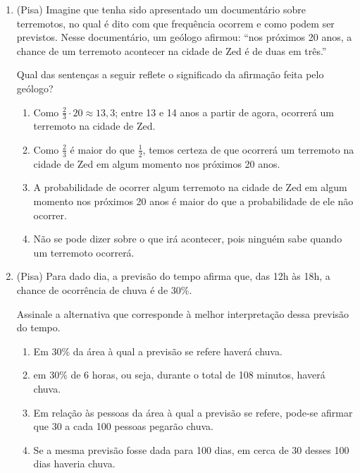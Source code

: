 \begin{enumerate}

\item (Pisa) Imagine que tenha sido apresentado um documentário sobre terremotos, no qual é dito com que frequência ocorrem  e como podem ser previstos. Nesse documentário, um geólogo afirmou: “nos próximos  20 anos, a chance de um terremoto acontecer na cidade de Zed é de duas em três.”

Qual das sentenças a seguir reflete o significado da afirmação feita pelo geólogo?
\begin{enumerate}
\item {} 
Como \(\frac{2}{3}\cdot 20\approx 13,3\); entre 13 e 14 anos a partir de agora, ocorrerá um terremoto na cidade de Zed.

\item {} 
Como \(\frac{2}{3}\) é maior do que \(\frac{1}{2}\), temos certeza de que ocorrerá um terremoto na cidade de Zed em algum momento nos próximos 20 anos.

\item {} 
A probabilidade de ocorrer algum terremoto na cidade de Zed em algum momento nos próximos 20 anos é maior do que a probabilidade de ele não ocorrer.

\item {} 
Não se pode dizer sobre o que irá acontecer, pois ninguém sabe quando um terremoto ocorrerá.

\end{enumerate}

\item (Pisa) Para dado dia, a previsão do tempo afirma que, das 12h às 18h, a chance de ocorrência de chuva é de 30\%.

Assinale a alternativa que corresponde à melhor interpretação dessa previsão do tempo.
\begin{enumerate}
\item {} 
Em 30\% da área à qual a previsão se refere haverá chuva.

\item {} 
em 30\% de 6 horas, ou seja, durante o total de 108 minutos, haverá chuva.

\item {} 
Em relação às pessoas da área à qual a previsão se refere, pode-se afirmar que 30 a cada 100 pessoas pegarão chuva.

\item {} 
Se a mesma previsão fosse dada para 100 dias, em cerca de 30 desses 100 dias haveria chuva.


\end{enumerate}
\end{enumerate}
